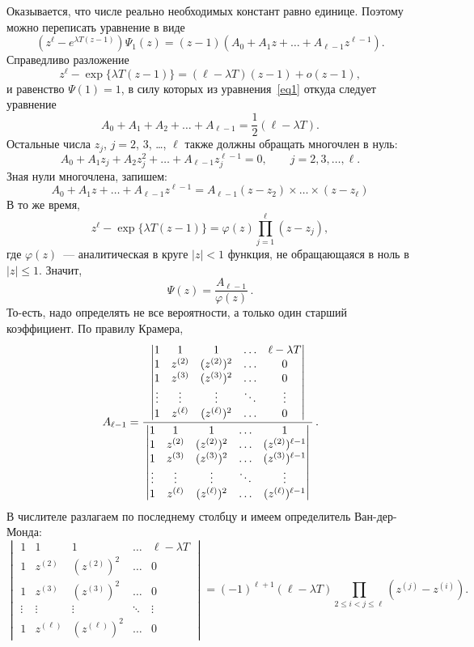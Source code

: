 \documentclass[10pt,oneside,final]{book}
\begin{document}
Оказывается, что числе реально необходимых констант равно единице.
Поэтому можно переписать уравнение в виде
\begin{equation}
  \label{eq1}
  (z^\ell-e^{\lambda T(z-1)}) \Psi_1(z) = (z-1)(A_0+A_1z+\ldots+A_{\ell-1}z^{\ell-1}).
\end{equation}
Справедливо разложение
\[
z^\ell-\exp\{\lambda T(z-1)\}=(\ell-\lambda T)(z-1)+o(z-1),
\]
и равенство $\Psi(1)=1$, в силу которых из уравнения~\eqref{eq1} откуда следует уравнение
\[
A_0+A_1+A_2+\ldots+A_{\ell-1}=\frac12(\ell-\lambda T).
\]
Остальные числа $z_j$, $j=2$, $3$, \ldots, $\ell$ также должны обращать многочлен в нуль:
\[
A_0+A_1z_j+A_2z_j^2+\ldots+A_{\ell-1}z_j^{\ell-1}=0,\qquad j=2, 3, \ldots, \ell.
\]
Зная нули многочлена, запишем:
\[
A_0+A_1z+\ldots+A_{\ell-1}z^{\ell-1}=A_{\ell-1}(z-z_2)\times \ldots \times (z-z_
\ell)
\]
В то же время,
\[
z^\ell-\exp\{\lambda T(z-1)\}=\varphi(z)\prod_{j=1}^\ell (z-z_j),
\]
где $\varphi(z)$~--- аналитическая в круге $|z|<1$ функция, не обращающаяся в ноль в
$|z|\leqslant1$.  Значит,
\[
\Psi(z)=\dfrac{A_{\ell-1}}{\varphi(z)}\,.
\]
То-есть, надо определять не все вероятности, а только один старший коэффициент. По правилу Крамера,
\[
A_{\ell-1}=\dfrac{%
  \begin{vmatrix}
    1 & 1 & 1 & \ldots & \ell-\lambda T \\
    1 & z^{(2)} & (z^{(2)})^2 & \ldots & 0\\
    1 & z^{(3)} & (z^{(3)})^2 & \ldots & 0\\
    \vdots & \vdots & \vdots & \ddots & \vdots\\
    1 & z^{(\ell)} & (z^{(\ell)})^2 & \ldots & 0
  \end{vmatrix}
}{\:%
  \begin{vmatrix}
    1 & 1 & 1 & \ldots & 1 \\
    1 & z^{(2)} & (z^{(2)})^2 & \ldots & (z^{(2)})^{\ell-1}\\
    1 & z^{(3)} & (z^{(3)})^2 & \ldots & (z^{(3)})^{\ell-1}\\
    \vdots & \vdots & \vdots & \ddots & \vdots\\
    1 & z^{(\ell)} & (z^{(\ell)})^2 & \ldots & (z^{(\ell)})^{\ell-1}
  \end{vmatrix}\:
}\,.
\]
В числителе разлагаем по последнему столбцу и имеем определитель Ван-дер-Монда:
\[
  \begin{vmatrix}
    1 & 1 & 1 & \ldots & \ell-\lambda T \\
    1 & z^{(2)} & (z^{(2)})^2 & \ldots & 0\\
    1 & z^{(3)} & (z^{(3)})^2 & \ldots & 0\\
    \vdots & \vdots & \vdots & \ddots & \vdots\\
    1 & z^{(\ell)} & (z^{(\ell)})^2 & \ldots & 0
  \end{vmatrix} = (-1)^{\ell+1}(\ell-\lambda T) \prod_{2\leqslant i<j\leqslant \ell} (z^{(j)}-z^{(i)}).
\]
\end{document}
